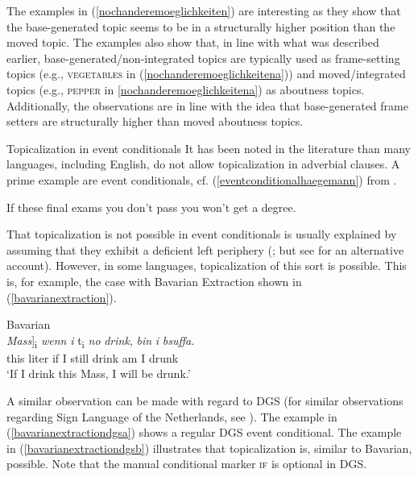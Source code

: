 \noindent The examples in (\ref{nochanderemoeglichkeiten}) are interesting as they show that the base-generated topic seems to be in a structurally higher position than the moved topic. The examples also show that, in line with what was described earlier, base-generated/non-integrated topics are typically used as frame-setting topics (e.g., \textsc{vegetables} in (\ref{nochanderemoeglichkeitena})) and moved/integrated topics (e.g., \textsc{pepper} in \ref{nochanderemoeglichkeitena}) as aboutness topics. Additionally, the observations are in line with the idea that base-generated frame setters are structurally higher than moved aboutness topics. 



\begin{digression}{Topicalization in event conditionals}{}
\noindent It has been noted in the literature than many languages, including English, do not allow topicalization in adverbial clauses. A prime example are event conditionals, cf. (\ref{eventconditionalhaegemann}) from \citet[332]{haegeman2003conditional}.

\begin{exe}
\ex *If these final exams you don't pass you won't get a degree. \label{eventconditionalhaegemann}
\end{exe}

\noindent That topicalization is not possible in event conditionals is usually explained by assuming that they exhibit a deficient left periphery (\citealt{haegeman2003conditional, haegeman2004topicalization}; but see \citealt{haegeman2013syntax} for an alternative account). However, in some languages, topicalization of this sort is possible. This is, for example, the case with Bavarian Extraction shown in (\ref{bavarianextraction}).

\begin{exe}
\ex Bavarian \citep[232]{grewendorf2015bavarian} \\ \gll {[\textit{De}} {\textit{Mass}]\textsubscript{i}} {\textit{wenn}} {\textit{i}} {t\textsubscript{i}} {\textit{no}} {\textit{drink},} {\textit{bin}} {\textit{i}} {\textit{bsuffa}.}   \\
{this} {liter} {if} {I} {} {still} {drink} {am} {I} {drunk} \\
\trans `If I drink this Mass, I will be drunk.'   \label{bavarianextraction}
\end{exe}

\noindent A similar observation can be made with regard to DGS (for similar observations regarding Sign Language of the Netherlands, see \citealt{pfau2008topics}). The example in (\ref{bavarianextractiondgsa}) shows a regular DGS event conditional. The example in (\ref{bavarianextractiondgsb}) illustrates that topicalization is, similar to Bavarian, possible. Note that the manual conditional marker \textsc{if} is optional in DGS. 


\end{digression}
